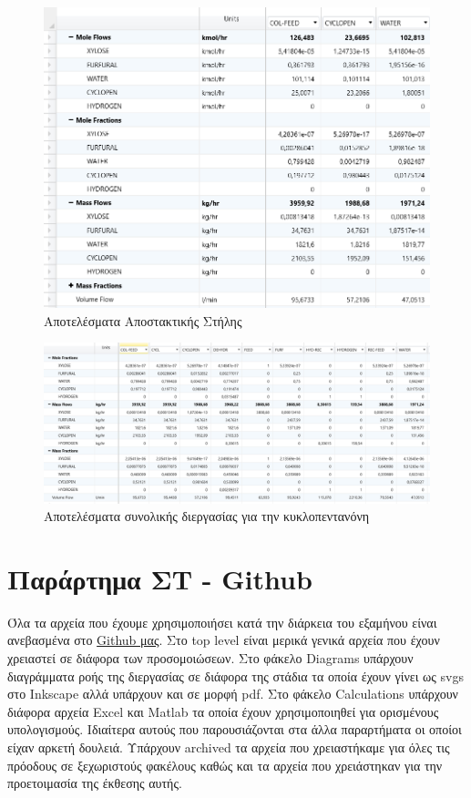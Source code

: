 \documentclass[11pt]{article}
\begin{document}
\begin{figure}[htbp]
\centering
\includegraphics[width=.9\linewidth]{Παράρτημα/2023-01-13_18-10-10_screenshot.png}
\caption{Αποτελέσματα Αποστακτικής Στήλης}
\end{figure}

\begin{figure}[htbp]
\centering
\includegraphics[width=.9\linewidth]{Παράρτημα/2023-01-13_18-10-19_screenshot.png}
\caption{Αποτελέσματα συνολικής διεργασίας για την κυκλοπεντανόνη}
\end{figure}

\pagebreak

\section{Παράρτημα ΣΤ - Github}
\label{sec:org4bf356a}
Όλα τα αρχεία που έχουμε χρησιμοποιήσει κατά την διάρκεια του εξαμήνου είναι ανεβασμένα στο \href{https://github.com/Vidianos-Giannitsis/Process-Design}{Github μας}. Στο top level είναι μερικά γενικά αρχεία που έχουν χρειαστεί σε διάφορα των προσομοιώσεων. Στο φάκελο Diagrams υπάρχουν διαγράμματα ροής της διεργασίας σε διάφορα της στάδια τα οποία έχουν γίνει ως svgs στο Inkscape αλλά υπάρχουν και σε μορφή pdf. Στο φάκελο Calculations υπάρχουν διάφορα αρχεία Excel και Matlab τα οποία έχουν χρησιμοποιηθεί για ορισμένους υπολογισμούς. Ιδιαίτερα αυτούς που παρουσιάζονται στα άλλα παραρτήματα οι οποίοι είχαν αρκετή δουλειά. Υπάρχουν archived τα αρχεία που χρειαστήκαμε για όλες τις πρόοδους σε ξεχωριστούς φακέλους καθώς και τα αρχεία που χρειάστηκαν για την προετοιμασία της έκθεσης αυτής.
\end{document}
